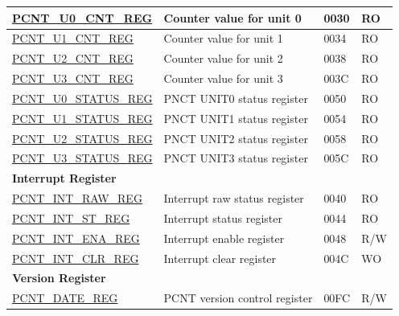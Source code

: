 \begin{longtable}{ | p{6cm} | p{7.2cm} | p{1.3cm} | p{1cm} | }
\hyperref[regdesc:PCNTUNCNTREG]{PCNT\_U0\_CNT\_REG} & Counter value for unit 0 & \hexprefix{}0030 & RO \\ \hline
\hyperref[regdesc:PCNTUNCNTREG]{PCNT\_U1\_CNT\_REG} & Counter value for unit 1 & \hexprefix{}0034 & RO \\ \hline
\hyperref[regdesc:PCNTUNCNTREG]{PCNT\_U2\_CNT\_REG} & Counter value for unit 2 & \hexprefix{}0038 & RO \\ \hline
\hyperref[regdesc:PCNTUNCNTREG]{PCNT\_U3\_CNT\_REG} & Counter value for unit 3 & \hexprefix{}003C & RO \\ \hline
\hyperref[regdesc:PCNTUNSTATUSREG]{PCNT\_U0\_STATUS\_REG} & PNCT UNIT0 status register & \hexprefix{}0050 & RO \\ \hline
\hyperref[regdesc:PCNTUNSTATUSREG]{PCNT\_U1\_STATUS\_REG} & PNCT UNIT1 status register & \hexprefix{}0054 & RO \\ \hline
\hyperref[regdesc:PCNTUNSTATUSREG]{PCNT\_U2\_STATUS\_REG} & PNCT UNIT2 status register & \hexprefix{}0058 & RO \\ \hline
\hyperref[regdesc:PCNTUNSTATUSREG]{PCNT\_U3\_STATUS\_REG} & PNCT UNIT3 status register & \hexprefix{}005C & RO \\ \hline
\multicolumn{4}{|l|}{\textbf{Interrupt Register}} \\ \hline
\hyperref[regdesc:PCNTINTRAWREG]{PCNT\_INT\_RAW\_REG} & Interrupt raw status register & \hexprefix{}0040 & RO \\ \hline
\hyperref[regdesc:PCNTINTSTREG]{PCNT\_INT\_ST\_REG} & Interrupt status register & \hexprefix{}0044 & RO \\ \hline
\hyperref[regdesc:PCNTINTENAREG]{PCNT\_INT\_ENA\_REG} & Interrupt enable register & \hexprefix{}0048 & R/W \\ \hline
\hyperref[regdesc:PCNTINTCLRREG]{PCNT\_INT\_CLR\_REG} & Interrupt clear register & \hexprefix{}004C & WO \\ \hline
\multicolumn{4}{|l|}{\textbf{Version Register}} \\ \hline
\hyperref[regdesc:PCNTDATEREG]{PCNT\_DATE\_REG} & PCNT version control register & \hexprefix{}00FC & R/W \\ \hline
\end{longtable}

